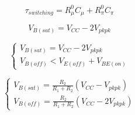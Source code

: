 \documentclass[titlepage, letterpaper, 10.5pt]{article}
\begin{document}
\begin{equation}
\tau_{switching}=R_{\mu}^{0}C_{\mu}+R_{\pi}^{0}C_{\pi}
\end{equation}

\begin{equation}
V_{B(sat)}=V_{CC}-2V_{pkpk}
\end{equation}

\begin{equation}
\left\{\begin{array}{lr}
V_{B(sat)}=V_{CC}-2V_{pkpk}	\\
V_{B(off)}<V_{E(off)}+V_{BE(on)}
\end{array}\right.
\end{equation}

\begin{equation}
\left\{\begin{array}{lr}
V_{B(sat)}=\frac{R_{2}}{R_{1}+R_{2}}(V_{CC}-V_{pkpk})	\\
V_{B(off)}=\frac{R_{2}}{R_{1}+R_{2}}(V_{CC}-2V_{pkpk})
\end{array}\right.
\end{equation}
\end{document}
